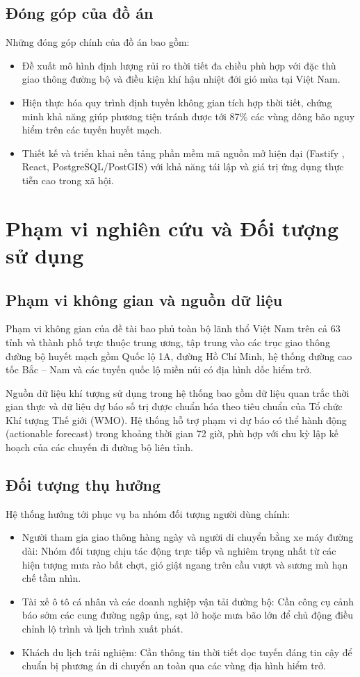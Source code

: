 \subsection{Đóng góp của đồ án}
Những đóng góp chính của đồ án bao gồm:
\begin{itemize}
    \item Đề xuất mô hình định lượng rủi ro thời tiết đa chiều phù hợp với đặc thù giao thông đường bộ và điều kiện khí hậu nhiệt đới gió mùa tại Việt Nam.
    \item Hiện thực hóa quy trình định tuyến không gian tích hợp thời tiết, chứng minh khả năng giúp phương tiện tránh được tới 87\% các vùng dông bão nguy hiểm trên các tuyến huyết mạch.
    \item Thiết kế và triển khai nền tảng phần mềm mã nguồn mở hiện đại (Fastify \cite{fastify2024}, React, PostgreSQL/PostGIS) với khả năng tái lập và giá trị ứng dụng thực tiễn cao trong xã hội.
\end{itemize}

\section{Phạm vi nghiên cứu và Đối tượng sử dụng}

\subsection{Phạm vi không gian và nguồn dữ liệu}
Phạm vi không gian của đề tài bao phủ toàn bộ lãnh thổ Việt Nam trên cả 63 tỉnh và thành phố trực thuộc trung ương, tập trung vào các trục giao thông đường bộ huyết mạch gồm Quốc lộ 1A, đường Hồ Chí Minh, hệ thống đường cao tốc Bắc -- Nam và các tuyến quốc lộ miền núi có địa hình dốc hiểm trở.

Nguồn dữ liệu khí tượng sử dụng trong hệ thống bao gồm dữ liệu quan trắc thời gian thực và dữ liệu dự báo số trị được chuẩn hóa theo tiêu chuẩn của Tổ chức Khí tượng Thế giới (WMO). Hệ thống hỗ trợ phạm vi dự báo có thể hành động (actionable forecast) trong khoảng thời gian 72 giờ, phù hợp với chu kỳ lập kế hoạch của các chuyến đi đường bộ liên tỉnh.

\subsection{Đối tượng thụ hưởng}
Hệ thống hướng tới phục vụ ba nhóm đối tượng người dùng chính:
\begin{itemize}
    \item Người tham gia giao thông hàng ngày và người di chuyển bằng xe máy đường dài: Nhóm đối tượng chịu tác động trực tiếp và nghiêm trọng nhất từ các hiện tượng mưa rào bất chợt, gió giật ngang trên cầu vượt và sương mù hạn chế tầm nhìn.
    \item Tài xế ô tô cá nhân và các doanh nghiệp vận tải đường bộ: Cần công cụ cảnh báo sớm các cung đường ngập úng, sạt lở hoặc mưa bão lớn để chủ động điều chỉnh lộ trình và lịch trình xuất phát.
    \item Khách du lịch trải nghiệm: Cần thông tin thời tiết dọc tuyến đáng tin cậy để chuẩn bị phương án di chuyển an toàn qua các vùng địa hình hiểm trở.
\end{itemize}

